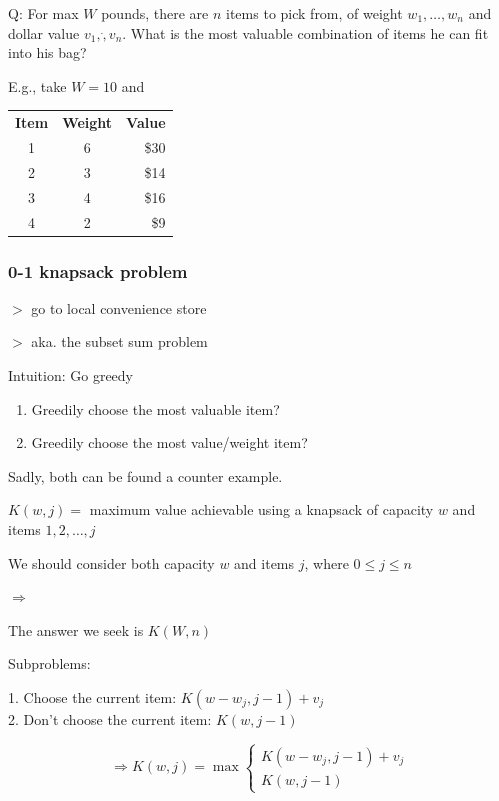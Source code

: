 \documentclass[12pt,a4paper]{article}
\newcommand{\remark}[1]{
    {\small $>$ {\color{blue} #1}}
}
\begin{document}
Q: For max $W$ pounds, there are $n$ items to pick from, of weight $w_1, \dots, w_n$ and dollar value $v_1, \dot, v_n$. 
What is the most valuable combination of items he can fit into his bag?

E.g., take $W = 10$ and 

\begin{table}[h]
    \centering
    \begin{tabular}{c c r}
        \textbf{Item} & \textbf{Weight} & \textbf{Value} \\
        1 & 6 & \$30 \\
        2 & 3 & \$14 \\
        3 & 4 & \$16 \\
        4 & 2 & \$9 \\
    \end{tabular}
\end{table}

\subsubsection*{0-1 knapsack problem}

\remark{go to local convenience store}

\remark{aka. the subset sum problem}

Intuition: Go greedy

\begin{enumerate}
  \item Greedily choose the most valuable item?
  \item Greedily choose the most value/weight item?
\end{enumerate}

Sadly, both can be found a counter example.

$K(w, j) =$ maximum value achievable using a knapsack of capacity $w$ and items $1, 2, \dots, j$

We should consider both capacity $w$ and items $j$, where $0 \leq j \leq n$

$\Rightarrow$

The answer we seek is $K(W, n)$

Subproblems:

1. Choose the current item: $K(w - w_j, j - 1) + v_j$ \\
2. Don't choose the current item: $K(w, j - 1)$

\[
\Rightarrow
K(w, j) = \max \left\{
\begin{array}{l}
    K(w - w_j, j - 1) + v_j \\
    K(w, j - 1)
\end{array}
\right.
\]
\end{document}

